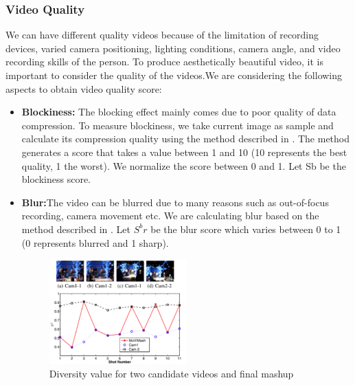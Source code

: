 \documentclass{sig-alternate}
\begin{document}
\subsubsection{Video Quality}
We can have different quality videos because of the limitation of recording devices, varied camera positioning, lighting conditions, camera angle, and video recording skills of the person. To produce aesthetically beautiful video, it is important to consider the quality of the videos.We are considering the following aspects to obtain video quality score:
\begin{itemize}
    \item \textbf{Blockiness:} The blocking effect mainly comes due to poor quality of data compression. To measure blockiness, we take current image as sample and calculate its compression quality using the method described in \cite{18}. The method generates a score that takes a value between 1 and 10 (10 represents the best quality, 1 the worst). We normalize the score between 0 and 1. Let Sb be the blockiness score.

    \item \textbf{Blur:}The video can be blurred due to many reasons such as out-of-focus recording, camera movement etc. We are calculating blur based on the method described in \cite{5}. Let $S^br$ be the blur score which varies between 0 to 1 (0 represents blurred and 1 sharp).

    \begin{figure}[h]
    \centering
    \includegraphics[width=0.5\textwidth]{img5.png}
    \caption{Diversity value for two candidate videos and final mashup}
    \label{fig:mesh5}
\end{figure}


\end{itemize}
\end{document}
